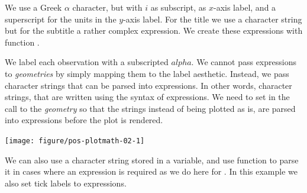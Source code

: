 \documentclass[krantz2]{krantz}\usepackage{knitr}%
\begin{document}
We use a Greek $\alpha$ character, but with $i$ as subscript, as $x$-axis label, and a superscript for the units in the $y$-axis label. For the title we use a character string but for the subtitle a rather complex expression. We create these expressions with function .

We label each observation with a subscripted $alpha$. We cannot pass expressions to \emph{geometries} by simply mapping them to the label aesthetic. Instead, we pass character strings that can be parsed into expressions. In other words, character strings, that are written using the syntax of expressions. We need to set  in the call to the \emph{geometry} so that the strings instead of being plotted as is, are parsed into expressions before the plot is rendered.

\begin{knitrout}\footnotesize
{}\color{fgcolor}\begin{kframe}
\begin{alltt}
    \hlopt{+}
   \hlstd{()} \hlopt{+}
   \hlstd{(} \hlstd{=} \hlstd{,}  \hlstd{=} \hlstd{,}  \hlstd{=} \hlstd{)} \hlopt{+}
   \hlstd{(} \hlstd{=} 
         \hlstd{=} \hlopt{~~}\hlopt{~}\hlopt{^}\hlstd{\{}\hlopt{-}\hlstd{\})),}
         \hlstd{=} \hlstd{,}
         \hlstd{=} \hlstd{(}\hlstd{(alpha[}\hlstd{]} \hlopt{+} 
\end{alltt}
\end{kframe}

{\centering \texttt{[image: figure/pos-plotmath-02-1]} 

}



\end{knitrout}

We can also use a character string stored in a variable, and use function  to parse it in cases where an expression is required as we do here for . In this example we also set tick labels to expressions.
\end{document}
